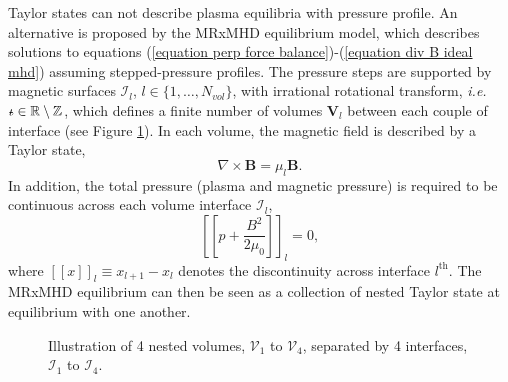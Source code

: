 \documentclass[my_thesis.tex]{subfiles}
\begin{document}
Taylor states can not describe plasma equilibria with pressure profile. An alternative is proposed by the MRxMHD equilibrium model, which describes solutions to equations (\ref{equation perp force balance})-(\ref{equation div B ideal mhd}) assuming stepped-pressure profiles. The pressure steps are supported by magnetic surfaces $\mathcal{I}_l$, $l\in\{1,\ldots,N_{vol}\}$, with irrational rotational transform, \textit{i.e.} $\text{$\iota\!\!$-}\in\mathbb{R}\setminus\mathbb{Z}$, which defines a finite number of volumes $\mathbf{V}_l$ between each couple of interface (see Figure \ref{fig:Illustration_SPEC}). In each volume, the magnetic field is described by a Taylor state, 
\begin{equation}
	\nabla\times\mathbf{B}=\mu_l\mathbf{B}. \label{eq.BeltramiEquation}
\end{equation}
In addition, the total pressure (plasma and magnetic pressure) is required to be continuous across each volume interface $\mathcal{I}_l$,
\begin{equation}
	\left[\left[p + \frac{B^2}{2\mu_0}\right]\right]_l = 0, \label{eq.force_balance}
\end{equation}
where $[[x]]_l\equiv x_{l+1}-x_l$ denotes the discontinuity across interface $l^{\text{th}}$. The MRxMHD equilibrium can then be seen as a collection of nested Taylor state at equilibrium with one another. 

\begin{figure}
	\centering
	\caption{Illustration of 4 nested volumes, $\mathcal{V}_1$ to $\mathcal{V}_4$, separated by 4 interfaces, $\mathcal{I}_1$ to $\mathcal{I}_4$.}
	\label{fig:Illustration_SPEC}
\end{figure}
\end{document}
